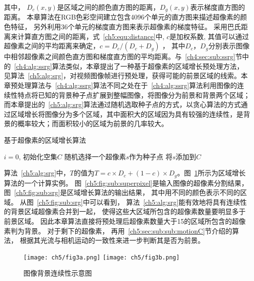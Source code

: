 其中， $D_c(x,y)$是区域之间的颜色直方图的距离，$D_g(x,y)$表示梯度直方图的距离。 本章算法在RGB色彩空间建立包含4096个单元的直方图来描述超像素的颜色特征， 另外利用36个单元的梯度直方图来表示超像素的梯度特征。 采用巴氏距离来计算直方图之间的距离，式~\ref{ch5:equ:distance}中, $c$是加权系数, 其值可以通过超像素之间的平均距离来确定，$c = D_c / (D_c + D_g)$  ， 其中$D_c$，$D_g$分别表示图像中相邻超像素之间颜色直方图和梯度直方图的平均距离。与~\ref{ch4:sec:sub:ssrg}节中的~\ref{ch4:alg:ssrg}算法类似，本章提出了一种基于超像素的区域增长预处理方法，见算法~\ref{ch5:alg:srg}，对视频图像帧进行预处理，获得可能的前景区域的线索。本章预处理算法与~\ref{ch4:alg:ssrg}算法不同之处在于~\ref{ch4:alg:ssrg}算法利用图像的连续性特点将已知的背景种子点扩展到整幅图像，将图像分为前景和背景两个区域；而本章提出的~\ref{ch5:alg:srg}算法通过随机选取种子点的方式，以贪心算法的方式通过区域增长将图像分为多个区域，其中面积大的区域因为具有较强的连续性，是背景的概率较大；而面积较小的区域为前景的几率较大。
\renewcommand{\algorithmcfname}{算法}
\begin{algorithm}[ht]
\caption{基于超像素的区域增长算法}
\label{ch5:alg:srg}
\LinesNumbered
{}
  $i=0$, 初始化空集$C$ \;
 随机选择一个超像素$s$作为种子点\;
 将$s$添加到$C$ \;
\end{algorithm}

算法~\ref{ch5:alg:srg}中，$T$的值为$T= c \times D_c + (1-c) \times D_g$。图~\ref{ch5:fig:srg}所示为区域增长算法的一个计算实例。 图~\ref{ch5:fig:sub:superpixel}是输入图像的超像素分割结果， 图~\ref{ch5:fig:sub:srg}是区域增长算法的输出结果， 其中用不同的颜色表示不同的区域。 从图~\ref{ch5:fig:sub:srg}中可以看到， 算法~\ref{ch5:alg:srg}能有效地将具有连续性的背景区域超像素合并到一起， 使得这些大区域所包含的超像素数量要明显多于前景区域。 因此本章算法直接将预处理后超像素数量大于15的区域所包含的超像素判为背景。 对于剩下的超像素， 再用~\ref{ch5:sec:sub:sub:motionC}节介绍的算法， 根据其光流与相机运动的一致性来进一步判断其是否为前景。
 \begin{figure}[htb]
  \centering%
    {\texttt{[image: ch5/fig3a.png]}}%
 \hspace{1em}%
      {\texttt{[image: ch5/fig3b.png]}}

  \caption{图像背景连续性示意图}\label{ch5:fig:srg}
\end{figure}

